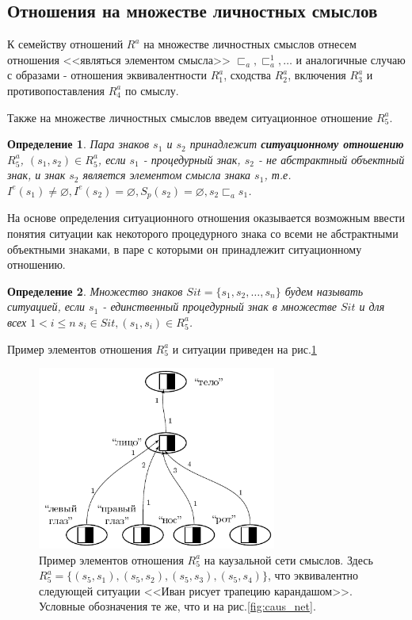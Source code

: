 \documentclass[12pt]{scrartcl}
\newtheorem{definition}{Определение}
\begin{document}
	\subsection{Отношения на множестве личностных смыслов}	
	К семейству отношений $R^a$ на множестве личностных смыслов отнесем отношения <<являться элементом смысла>> ${\sqsubset_a,\sqsubset_a^1,\dots}$ и аналогичные случаю с образами - отношения эквивалентности $R_1^a$, сходства $R_2^a$, включения $R_3^a$ и противопоставления $R_4^a$ по смыслу.
	
	Также на множестве личностных смыслов введем ситуационное отношение $R_5^a$.

	\begin{definition}
		Пара знаков $s_1$ и $s_2$ принадлежит \textbf{ситуационному отношению} $R_5^a$, $(s_1,s_2)\in R_5^a$, если $s_1$ - процедурный знак, $s_2$ - не абстрактный объектный знак, и знак $s_2$ является элементом смысла знака $s_1$, т.е. $I^e(s_1)\not = \varnothing, I^e(s_2) = \varnothing, S_p(s_2)=\varnothing, s_2\sqsubset_a s_1$.
	\end{definition}
	
	На основе определения ситуационного отношения оказывается возможным ввести понятия ситуации как некоторого процедурного знака со всеми не абстрактными объектными знаками, в паре с которыми он принадлежит ситуационному отношению.
	
	\begin{definition}
		Множество знаков $Sit=\{s_1,s_2,\dots,s_n\}$ будем называть \textit{ситуацией}, если $s_1$ - единственный процедурный знак в множестве $Sit$ и для всех $1<i\leq n\ s_i\in Sit, (s_1,s_i)\in R_5^a$.
	\end{definition}
	
	Пример элементов отношения $R_5^a$ и ситуации приведен на рис.\ref{fig:mean_relat}

	\begin{figure}[h]
		\centering
		\includegraphics[width=0.7\textwidth,page=3]{examples/causnet/caus_net}
		\caption{Пример элементов отношения $R_5^a$ на каузальной сети смыслов. Здесь $R_5^a=\{(s_5,s_1),(s_5,s_2),(s_5,s_3),(s_5,s_4)\}$, что эквивалентно следующей ситуации <<Иван рисует трапецию карандашом>>. Условные обозначения те же, что и на рис.\ref{fig:caus_net}.}
		\label{fig:mean_relat}		
	\end{figure}
			
\end{document}
